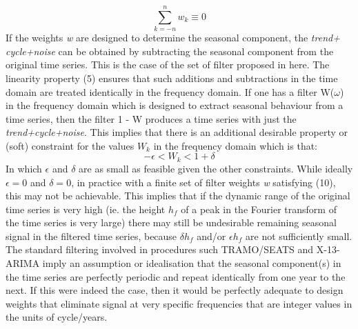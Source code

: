 \documentclass{article}
\begin{document}
\begin{equation}
\sum \limits_{k=-n}^n w_k \equiv 0
\end{equation}
If the weights \textit{w} are designed to determine the seasonal component, the \textit{trend+ cycle+noise} can be obtained by subtracting the seasonal component from the original time series. This is the case of the set of filter proposed in here. The linearity property (5) ensures that such additions and subtractions in the time domain are treated identically in the frequency domain. If one has a filter W($\omega$) in the frequency domain which is designed to extract seasonal behaviour from a time series, then the filter 1 - W produces a time series with just the \textit{trend+cycle+noise}. This implies that there is an additional desirable property or (soft) constraint for the values $W_k$ in the frequency domain which is that:
\begin{equation}
-\epsilon < W_k < 1+\delta
\end{equation}
In which $\epsilon$ and $\delta$ are as small as feasible given the other constraints. While ideally $\epsilon=0$ and $\delta=0$, in practice with a finite set of filter weights \textit{w} satisfying (10), this may not be achievable. This implies that if the dynamic range of the original time series is very high (ie. the height $h_f$ of a peak in the Fourier transform of the time series is very large) there may still be undesirable remaining seasonal signal in the filtered time series, because $\delta h_f$ and/or $\epsilon h_f$ are not sufficiently small.\\The standard filtering involved in procedures such TRAMO/SEATS and X-13-ARIMA imply an assumption or idealisation that the seasonal component(s) in the time series are perfectly periodic and repeat identically from one year to the next. If this were indeed the case, then it would be perfectly adequate to design weights that eliminate signal at very specific frequencies that are integer values in the units of cycle/years. %
\end{document}
